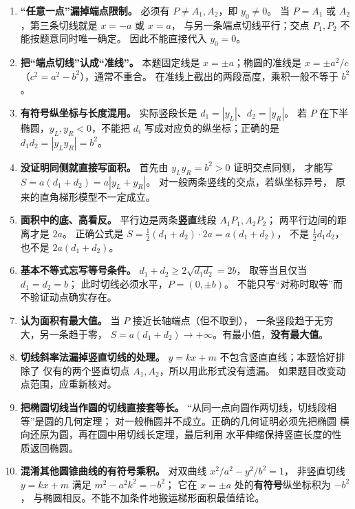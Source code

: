 \begin{trapbox}
\begin{enumerate}
  \item \textbf{“任意一点”漏掉端点限制。}
  必须有 $P\ne A_1,A_2$，即 $y_0\ne0$。
  当 $P=A_1$ 或 $A_2$，第三条切线就是 $x=-a$ 或 $x=a$，
  与另一条端点切线平行；交点 $P_1,P_2$ 不能按题意同时唯一确定。
  因此不能直接代入 $y_0=0$。

  \item \textbf{把“端点切线”认成“准线”。}
  本题固定线是 $x=\pm a$；椭圆的准线是
  $x=\pm a^2/c$（$c^2=a^2-b^2$），通常不重合。
  在准线上截出的两段高度，乘积一般不等于 $b^2$。

  \item \textbf{有符号纵坐标与长度混用。}
  实际竖段长是 $d_1=|y_L|$、$d_2=|y_R|$。
  若 $P$ 在下半椭圆，$y_L,y_R<0$，不能把
  $d_i$ 写成对应负的纵坐标；正确的是
  $d_1d_2=|y_Ly_R|=b^2$。

  \item \textbf{没证明同侧就直接写面积。}
  首先由 $y_Ly_R=b^2>0$ 证明交点同侧，
  才能写 $S=a(d_1+d_2)=a|y_L+y_R|$。
  对一般两条竖线的交点，若纵坐标异号，
  原来的直角梯形模型不一定成立。

  \item \textbf{面积中的底、高看反。}
  平行边是两条\textbf{竖直}线段 $A_1P_1,A_2P_2$；
  两平行边间的距离才是 $2a$。
  正确公式是
  $S=\tfrac12(d_1+d_2)\cdot2a=a(d_1+d_2)$，
  不是 $\tfrac12d_1d_2$，也不是 $2a(d_1+d_2)$。

  \item \textbf{基本不等式忘写等号条件。}
  $d_1+d_2\ge2\sqrt{d_1d_2}=2b$，
  取等当且仅当 $d_1=d_2=b$；
  此时切线必须水平，$P=(0,\pm b)$。
  不能只写“对称时取等”而不验证动点确实存在。

  \item \textbf{认为面积有最大值。}
  当 $P$ 接近长轴端点（但不取到），
  一条竖段趋于无穷大，另一条趋于零，
  $S=a(d_1+d_2)\to+\infty$。有最小值，\textbf{没有最大值}。

  \item \textbf{切线斜率法漏掉竖直切线的处理。}
  $y=kx+m$ 不包含竖直直线；本题恰好排除了
  仅有的两个竖直切点 $A_1,A_2$，所以用此形式没有遗漏。
  如果题目改变动点范围，应重新核对。

  \item \textbf{把椭圆切线当作圆的切线直接套等长。}
  “从同一点向圆作两切线，切线段相等”是圆的几何定理；
  对一般椭圆并不成立。正确的几何证明必须先把椭圆
  横向还原为圆，再在圆中用切线长定理，最后利用
  水平伸缩保持竖直长度的性质返回椭圆。

  \item \textbf{混淆其他圆锥曲线的有符号乘积。}
  对双曲线 $x^2/a^2-y^2/b^2=1$，
  非竖直切线 $y=kx+m$ 满足 $m^2-a^2k^2=-b^2$；
  它在 $x=\pm a$ 处的\textbf{有符号}纵坐标积为 $-b^2$，
  与椭圆相反。不能不加条件地搬运梯形面积最值结论。
\end{enumerate}
\end{trapbox}
